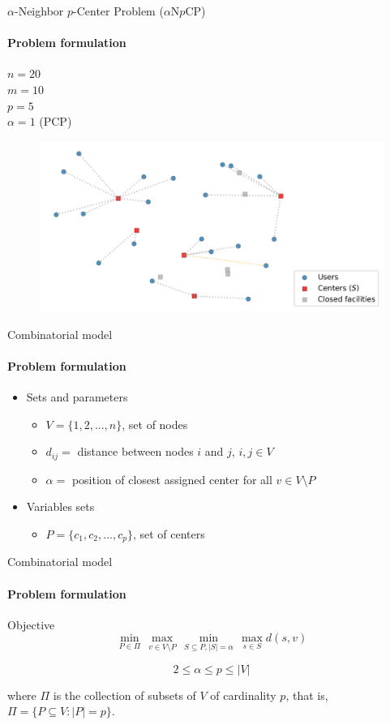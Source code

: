 \documentclass{beamer}
\newcommand{\anpcp}{$\alpha$N$p$CP\xspace}
\begin{document}
\begin{frame}{$\alpha$-Neighbor $p$-Center Problem (\anpcp)}
    \framesubtitle{Problem formulation}
    
    $n = 20$ \\
    $m = 10$ \\
    $p = 5$ \\
    $\alpha = 1$ (PCP)
    
    \begin{figure}
        \centering
        \includegraphics[scale=0.7]{1npcp}
        \label{fig:1npcp}
    \end{figure}
\end{frame}

\begin{frame}{Combinatorial model}
    \framesubtitle{Problem formulation}
    \begin{itemize}
        \item Sets and parameters
        \begin{itemize}
            \item $V = \{1, 2, ..., n\}$, set of nodes
            \item $d_{ij} = $ distance between nodes $i$ and $j$, $i,j \in V$
            \item $\alpha = $ position of closest assigned center for all $v \in V \setminus P$
        \end{itemize}
        
        \item Variables sets
        \begin{itemize}
            \item $P = \{c_1, c_2, ..., c_p\}$, set of centers
        \end{itemize}
    \end{itemize}
\end{frame}

\begin{frame}{Combinatorial model}
    \framesubtitle{Problem formulation}
    \begin{block}{Objective}
        $$
        \min\limits_{P \in \Pi} \,
        \max\limits_{v \in V \setminus P} \,
        \min\limits_{S \subseteq P, |S| = \alpha} \,
        \max\limits_{s \in S}{d(s, v)}
        $$
        
        $$2 \leq \alpha \leq p \leq |V|$$
    \end{block}
    
    where $\Pi$ is the collection of subsets of $V$ of cardinality $p$, that is, $\Pi = \{ P \subseteq V : |P|=p \}$.
\end{frame}
\end{document}
